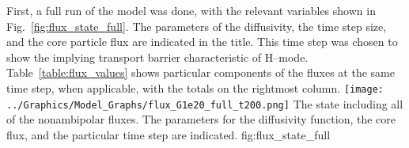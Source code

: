 First, a full run of the model was done, with the relevant variables shown in Fig.~\ref{fig:flux_state_full}.
The parameters of the diffusivity, the time step size, and the core particle flux are indicated in the title.
This time step was chosen to show the implying transport barrier characteristic of H--mode.
Table~\ref{table:flux_values} shows particular components of the fluxes at the same time step, when applicable, with the totals on the rightmost column.
	{\texttt{[image: ../Graphics/Model\_Graphs/flux\_G1e20\_full\_t200.png]}}
	{The state including all of the nonambipolar fluxes.
	The parameters for the diffusivity function, the core flux, and the particular time step are indicated.
	}
	{fig:flux_state_full}

